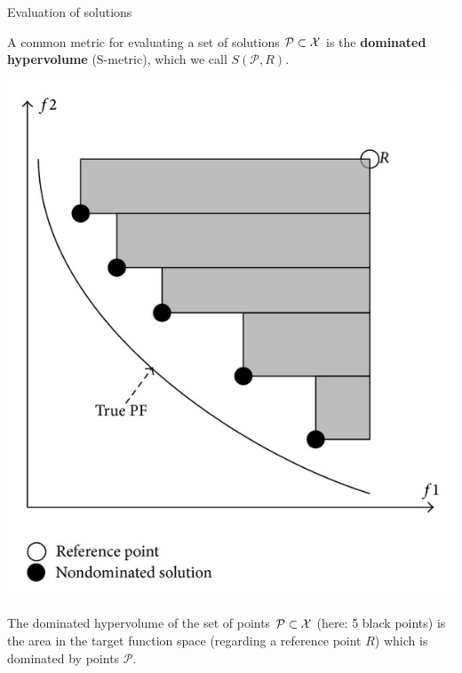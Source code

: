 \begin{frame}[allowframebreaks]{Evaluation of solutions}

A common metric for evaluating a set of solutions $\mathcal{P} \subset \mathcal{X}$ is the \textbf{dominated hypervolume} (S-metric), which we call $S(\mathcal{P}, R)$.

\vspace*{-0.4cm}

\begin{center}
\includegraphics[width = 0.35\linewidth]{images/dominated_hypervolume.png}
\end{center}

\vspace*{-0.4cm}

The dominated hypervolume of the set of points $\mathcal{P} \subset \mathcal{X}$ (here: 5 black points) is the area in the target function space (regarding a reference point $R$) which is dominated by points $\mathcal{P}$.

\end{frame}



%
%
%
%
%
%
%
%
%
%
%
%
%
%


